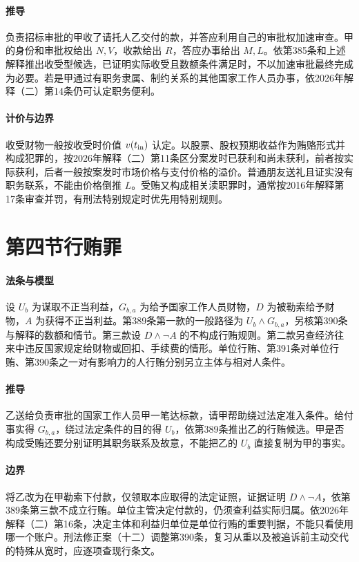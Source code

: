 \paragraph{推导}
负责招标审批的甲收了请托人乙交付的款，并答应利用自己的审批权加速审查。甲的身份和审批权给出 \(N,V\)，收款给出 \(R\)，答应办事给出 \(M,L\)。依第385条和上述解释推出收受型候选，已证明实际收受且数额条件满足时，不以加速审批最终完成为必要。若是甲通过有职务隶属、制约关系的其他国家工作人员办事，依2026年解释（二）第14条仍可认定职务便利。

\paragraph{计价与边界}
收受财物一般按收受时价值 \(v(t_{\rm in})\) 认定。以股票、股权预期收益作为贿赂形式并构成犯罪的，按2026年解释（二）第11条区分案发时已获利和尚未获利，前者按实际获利，后者一般按案发时市场价格与支付价格的溢价。普通朋友送礼且证实没有职务联系，不能由价格倒推 \(L\)。受贿又构成相关渎职罪时，通常按2016年解释第17条审查并罚，有刑法特别规定时优先用特别规则。

\section{第四节\quad 行贿罪}

\paragraph{法条与模型}
设 \(U_b\) 为谋取不正当利益，\(G_{b,a}\) 为给予国家工作人员财物，\(D\) 为被勒索给予财物，\(A\) 为获得不正当利益。第389条第一款的一般路径为 \(U_b\land G_{b,a}\)，另核第390条与解释的数额和情节。第三款设 \(D\land\neg A\) 的不构成行贿规则。第二款另查经济往来中违反国家规定给财物或回扣、手续费的情形。单位行贿、第391条对单位行贿、第390条之一对有影响力的人行贿分别另立主体与相对人条件。

\paragraph{推导}
乙送给负责审批的国家工作人员甲一笔达标款，请甲帮助绕过法定准入条件。给付事实得 \(G_{b,a}\)，绕过法定条件的目的得 \(U_b\)，依第389条推出乙的行贿候选。甲是否构成受贿还要分别证明其职务联系及故意，不能把乙的 \(U_b\) 直接复制为甲的事实。

\paragraph{边界}
将乙改为在甲勒索下付款，仅领取本应取得的法定证照，证据证明 \(D\land\neg A\)，依第389条第三款不成立行贿。单位主管决定付款的，仍须查利益实际归属。依2026年解释（二）第16条，决定主体和利益归单位是单位行贿的重要判据，不能只看使用哪一个账户。刑法修正案（十二）调整第390条，复习从重以及被追诉前主动交代的特殊从宽时，应逐项查现行条文。

